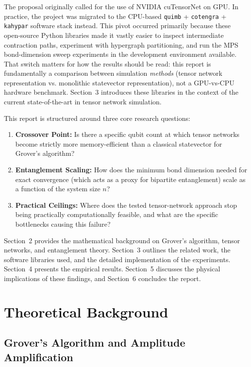 \documentclass[sigconf, authorversion, nonacm]{acmart}
\begin{document}
The proposal originally called for the use of NVIDIA cuTensorNet on GPU. In practice, the project was migrated to the CPU-based \texttt{quimb} + \texttt{cotengra} + \texttt{kahypar} software stack instead. This pivot occurred primarily because these open-source Python libraries made it vastly easier to inspect intermediate contraction paths, experiment with hypergraph partitioning, and run the MPS bond-dimension sweep experiments in the development environment available. That switch matters for how the results should be read: this report is fundamentally a comparison between simulation \emph{methods} (tensor network representation vs. monolithic statevector representation), not a GPU-vs-CPU hardware benchmark. Section~3 introduces these libraries in the context of the current state-of-the-art in tensor network simulation.

This report is structured around three core research questions:
\begin{enumerate}
    \item \textbf{Crossover Point:} Is there a specific qubit count at which tensor networks become strictly more memory-efficient than a classical statevector for Grover's algorithm?
    \item \textbf{Entanglement Scaling:} How does the minimum bond dimension needed for exact convergence (which acts as a proxy for bipartite entanglement) scale as a function of the system size $n$?
    \item \textbf{Practical Ceilings:} Where does the tested tensor-network approach stop being practically computationally feasible, and what are the specific bottlenecks causing this failure?
\end{enumerate}

Section~2 provides the mathematical background on Grover's algorithm, tensor networks, and entanglement theory. Section~3 outlines the related work, the software libraries used, and the detailed implementation of the experiments. Section~4 presents the empirical results. Section~5 discusses the physical implications of these findings, and Section~6 concludes the report.

\section{Theoretical Background}

\subsection{Grover's Algorithm and Amplitude Amplification}
\end{document}
